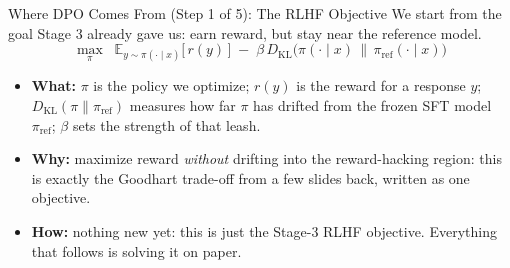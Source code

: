 \begin{frame}{Where DPO Comes From (Step 1 of 5): The RLHF Objective}
We start from the goal Stage 3 already gave us: earn reward, but stay near the
reference model.
\[
    \max_{\pi}\;\; \mathbb{E}_{y\sim\pi(\cdot\mid x)}\big[\, r(y)\, \big]
    \;-\; \beta\, D_{\mathrm{KL}}\!\big(\pi(\cdot\mid x)\, \big\|\, \pi_{\text{ref}}(\cdot\mid x)\big)
\]
\begin{itemize}\itemsep0.45em\small
    \item \textbf{What:} $\pi$ is the policy we optimize; $r(y)$ is the reward for a
          response $y$; $D_{\mathrm{KL}}(\pi\|\pi_{\text{ref}})$ measures how far
          $\pi$ has drifted from the frozen SFT model $\pi_{\text{ref}}$; $\beta$
          sets the strength of that leash.
    \item \textbf{Why:} maximize reward \emph{without} drifting into the
          reward-hacking region: this is exactly the Goodhart trade-off from a few
          slides back, written as one objective.
    \item \textbf{How:} nothing new yet: this is just the Stage-3 RLHF objective.
          Everything that follows is solving it on paper.
\end{itemize}
\end{frame}

